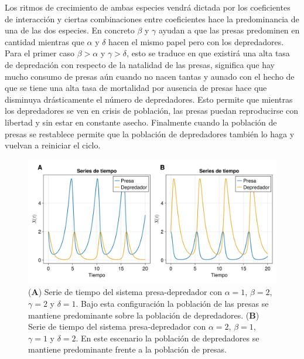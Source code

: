 Los ritmos de crecimiento de ambas especies vendrá dictada por los coeficientes de interacción y ciertas combinaciones entre coeficientes hace la predominancia de una de las dos especies. En concreto $\beta$ y $\gamma$ ayudan a que las presas predominen en cantidad mientras que $\alpha$ y $\delta$ hacen el mismo papel pero con los depredadores. Para el primer caso $\beta >\alpha$ y $\gamma>\delta$, esto se traduce en que existirá una alta tasa de depredación con respecto de la natalidad de las presas, significa que hay mucho consumo de presas aún cuando no nacen tantas y aunado con el hecho de que se tiene una alta tasa de mortalidad por ausencia de presas hace que disminuya drásticamente el número de depredadores. Esto permite que mientras los depredadores se ven en crisis de población, las presas puedan reproducirse con libertad y sin estar en constante asecho. Finalmente cuando la población de presas se restablece permite que la población de depredadores también lo haga y vuelvan a reiniciar el ciclo.\newpage 
\begin{figure}[h!]
	\centering
	\includegraphics[scale=0.23]{../Imagenes/Series de Tiempo PD}
	\caption{(\textbf{A}) Serie de tiempo del sistema presa-depredador con $\alpha=1$, $\beta=2$, $\gamma=2$ y $\delta=1$. Bajo esta configuración la población de las presas se mantiene predominante sobre la población de depredadores. (\textbf{B}) Serie de tiempo del sistema presa-depredador con $\alpha=2$, $\beta = 1$, $\gamma = 1$ y $\delta = 2$. En este escenario la población de depredadores se mantiene predominante frente a la población de presas.}
	\label{fig:SeriesdeTiempoPD}
\end{figure}

